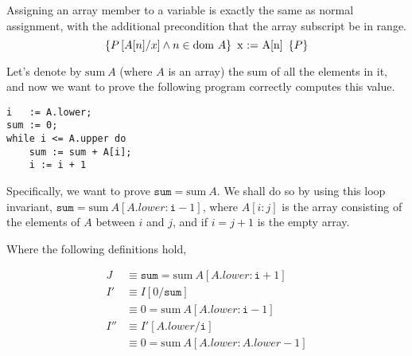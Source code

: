 \begin{definition}
  Assigning an array member to a variable is exactly the same as
  normal assignment, with the additional precondition that the array
  subscript be in range.
  \[\htriple{P\left[A[n]/x\right] \land n \in \dom~A}{x := A[n]}{P}\]
\end{definition}

\begin{example}
  \label{exmpl:heap-sum}
  
  Let's denote by $\mathrm{sum}~A$ (where $A$ is an array) the sum of
  all the elements in it, and now we want to prove the following
  program correctly computes this value.

\begin{verbatim}
i   := A.lower;
sum := 0;
while i <= A.upper do
    sum := sum + A[i];
    i := i + 1
\end{verbatim}

  Specifically, we want to prove $\mathtt{sum} = \mathrm{sum}~A$. We
  shall do so by using this loop invariant, $\mathtt{sum} =
  \mathrm{sum}~A[A.lower : \mathtt{i} - 1]$, where $A[i:j]$ is the
  array consisting of the elements of $A$ between $i$ and $j$, and if
  $i = j + 1$ is the empty array.

  \begin{prooftree}




  \end{prooftree}

  Where the following definitions hold,

  \begin{align*}
    J &\equiv \mathtt{sum} = \mathrm{sum}~A[A.lower : \mathtt{i} + 1]\\
    I' &\equiv I[0/\mathtt{sum}]\\
    &\equiv 0 = \mathrm{sum}~A[A.lower : \mathtt{i} - 1]\\
    I'' &\equiv I'[A.lower/\mathtt{i}]\\
    &\equiv 0 = \mathrm{sum}~A[A.lower : A.lower - 1]
  \end{align*}
\end{example}

